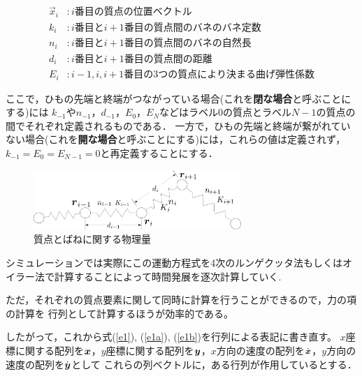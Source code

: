 \begin{align*}
  \vec{x}_{i} &: i\text{番目の質点の位置ベクトル} \\
  k_{i} &: i\text{番目と}i+1\text{番目の質点間のバネのバネ定数} \\
  n_{i} &: i\text{番目と}i+1\text{番目の質点間のバネの自然長} \\
  d_{i} &: i\text{番目と}i+1\text{番目の質点間の距離} \\
  E_{i} &: i-1,i,i+1\text{番目の3つの質点により決まる曲げ弾性係数}
\end{align*}

ここで，ひもの先端と終端がつながっている場合(これを\textbf{閉な場合}と呼ぶことにする)には
$k_{-1}$や$n_{-1}$，$d_{-1}$，$E_{0}$，$E_{N}$などはラベル$0$の質点とラベル$N-1$の質点の間でそれぞれ定義されるものである．
一方で，ひもの先端と終端が繋がれていない場合(これを\textbf{開な場合}と呼ぶことにする)には，これらの値は定義されず，
$k_{-1} = E_{0} = E_{N-1} = 0$と再定義することにする．

\begin{figure}[H]
  \begin{center}
    \includegraphics[width=0.7\textwidth]{../img/coordinates.pdf}
    \vspace{0.5cm}
    \caption{質点とばねに関する物理量}
    \label{fig:coodinates}
  \end{center}
\end{figure}


シミュレーションでは実際にこの運動方程式を4次のルンゲクッタ法もしくはオイラー法で計算することによって時間発展を逐次計算していく.

ただ，それぞれの質点要素に関して同時に計算を行うことができるので，力の項の計算を
行列として計算するほうが効率的である。

したがって，これから式(\ref{e1}), (\ref{e1a}), (\ref{e1b})を行列による表記に書き直す。
$x$座標に関する配列を$\mbox{\boldmath \(x\)}$，$y$座標に関する配列を$\mbox{\boldmath \(y\)}$，$x$方向の速度の配列を$\dot{\mbox{\boldmath \(x\)}}$，$y$方向の速度の配列を$\dot{\mbox{\boldmath \(y\)}}$として
これらの列ベクトルに，ある行列が作用しているとする．

